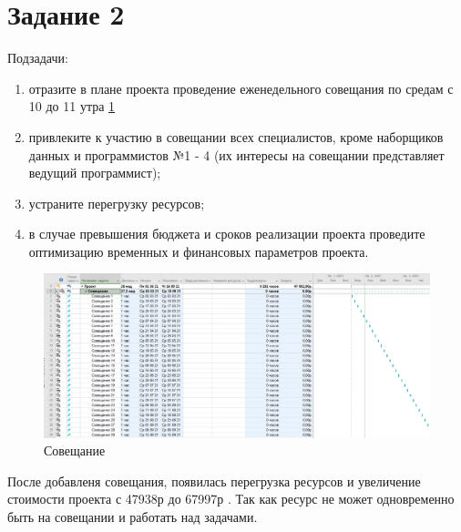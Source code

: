 \section{Задание 2}
Подзадачи:
\begin{enumerate}
	\item отразите в плане проекта проведение еженедельного совещания по
	средам с 10 до 11 утра \ref{fig:lab321}
	\item привлеките к участию в совещании всех специалистов, кроме
	наборщиков данных и программистов №1 - 4 (их интересы на совещании
	представляет ведущий программист);
	\item устраните перегрузку ресурсов;
	\item в случае превышения бюджета и сроков реализации проекта проведите
	оптимизацию временных и финансовых параметров проекта.
\end{enumerate}

\begin{figure}[h]
	\centering
	\includegraphics[width=0.7\linewidth]{src/lab3_2_1}
	\caption{Совещание}
	\label{fig:lab321}
\end{figure}

После добавленя совещания, появилась перегрузка ресурсов и увеличение стоимости проекта с 47938р до 67997р .
Так как ресурс не может одновременно быть на совещании и работать над задачами.













